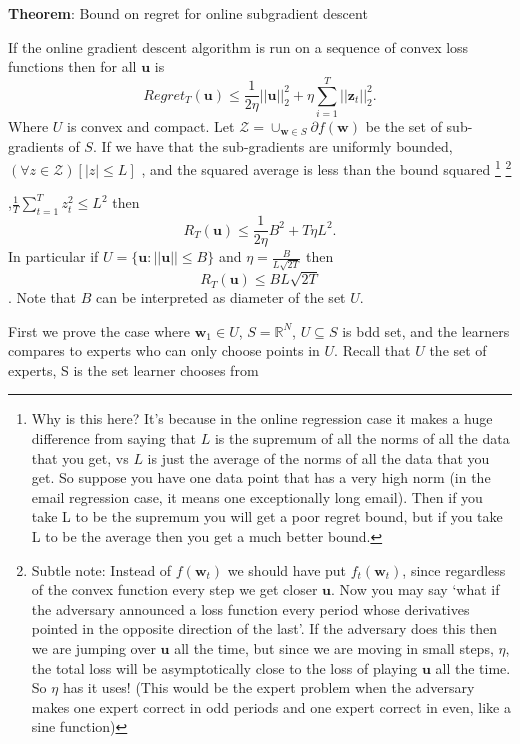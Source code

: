 \documentclass[11pt]{article}
\theoremstyle{quest}
\newcommand{\R}{\mathbb{R}}
\begin{document}
\begin{tcolorbox}
\begin{center}\textbf{Theorem}: Bound on regret for online subgradient descent\end{center}
If the online gradient descent algorithm is run on a sequence of convex loss functions then for all $\mathbf{u}$ is 
\begin{equation}\label{eq:bdd_gradient} Regret_T(\mathbf{u})\le \frac{1}{2\eta}||\mathbf{u}||^2_2+\eta \sum_{i=1}^T||\mathbf{z}_t||_2^2.\end{equation} Where $U$ is convex and compact. Let $\mathcal{Z} =  \cup_{\mathbf{w} \in S}\partial f(\mathbf{w})$ be the set of sub-gradients of $S$. If we have that the sub-gradients are uniformly bounded, $(\forall z \in \mathcal{Z} )[|z|\le L]$ , and the squared average is less than the bound squared%
%
\footnote{Why is this here? It's because in the online regression case it makes a huge difference from saying that $L$ is the supremum of all the norms of all the data that you get, vs $L $ is just the average of the norms of all the data that you get. So suppose you have one data point that has a very high norm (in the email regression case, it means one exceptionally long email). Then if you take L to be the supremum you will get a poor regret bound, but if you take L to be the average then you get a much better bound. } \footnote{Subtle note: Instead of $f(\mathbf{w}_t)$ we should have put $f_t(\mathbf{w}_t)$, since regardless of the convex function every step we get closer $\mathbf{u}$. Now you may say `what if the adversary announced a loss function every period  whose derivatives pointed in the opposite direction of the last'. If the adversary does this then we are jumping over $\mathbf{u}$ all the time, but since we are moving in small steps, $\eta$, the total loss will be asymptotically close to the loss of playing $\mathbf{u}$ all the time. So $\eta$ has it uses! (This would be the expert problem when the adversary makes one expert correct in odd periods and one expert correct in even, like a sine function)   }
%

,$\frac{1}{T}\sum_{t=1}^T z_t^2 \le L^2$ then $$R_T(\mathbf{u})\le \frac{1}{2\eta}B^2+T\eta L^2.$$ In particular if $U=\{\mathbf{u}: ||\mathbf{u}||\le B\}$ and $\eta = \frac{B}{L\sqrt{2T}}$ then $$R_T(\mathbf{u})\le BL\sqrt{2T}$$. Note that $B$ can be interpreted as diameter of the set $U$.
\end{tcolorbox}
First we prove the case where $\mathbf{w}_1\in U$,  $S = \R^N$, $U \subseteq S$ is bdd set, and the learners compares to experts who can only choose points in $U$. Recall that $U$ the set of experts, S is the set learner chooses from
\end{document}
